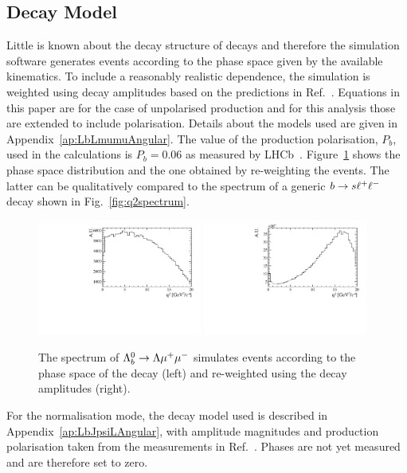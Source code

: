 \subsection{Decay Model}
\label{decaymodel}

Little is known about the decay structure of \Lb decays and therefore the simulation software generates events
according to the phase space given by the available kinematics. To include a reasonably realistic \qsq dependence,
the simulation is weighted using decay amplitudes based on the predictions in Ref.~\cite{Gutsche:2013pp}.
Equations in this paper are for the case of unpolarised \Lb production and for this analysis those are extended to include polarisation.
Details about the models used are given in Appendix~\ref{ap:LbLmumuAngular}. The value of the \Lb production polarisation, $P_b$, 
used in the calculations is $P_b = 0.06$ as measured by LHCb~\cite{Aaij:2013oxa}. 
Figure~\ref{fig:decaymodeleffonq2} shows the phase space \qsq distribution and the one obtained by re-weighting the events.
The latter can be qualitatively compared to the \qsq spectrum of a generic ${b}\rightarrow{\ensuremath{s}}\ell^+ \ell^-$ decay
shown in Fig.~\ref{fig:q2spectrum}.
%
\begin{figure}
\centering
\includegraphics[width=0.48\textwidth]{Lmumu/figs/Q2_beforemodel.pdf}
\includegraphics[width=0.48\textwidth]{Lmumu/figs/Q2_aftermodel.pdf}
\caption{The \qsq spectrum of ${{\Lambda}^0_{b}}\rightarrow{\ensuremath{\Lambda}}{\ensuremath{\mu^+\mu^-}}$ simulates events according to the
phase space of the decay (left) and re-weighted using the decay amplitudes (right).}
\label{fig:decaymodeleffonq2}
\end{figure}
%
For the normalisation mode, the decay model used is described in Appendix~\ref{ap:LbJpsiLAngular},
with amplitude magnitudes and production polarisation taken from the measurements in
Ref.~\cite{Aaij:2013oxa}. Phases are not yet measured and are therefore set to zero.

